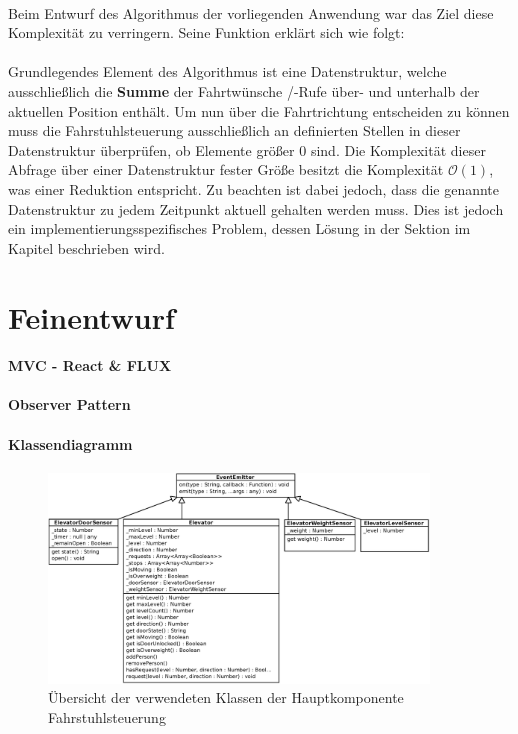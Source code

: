\paragraph{}Beim Entwurf des Algorithmus der vorliegenden Anwendung war das Ziel diese Komplexität zu verringern. Seine Funktion erklärt sich wie folgt:\\ \\ Grundlegendes Element des Algorithmus ist eine Datenstruktur, welche ausschließlich die \textbf{Summe} der Fahrtwünsche /-Rufe über- und unterhalb der aktuellen Position enthält. Um nun über die Fahrtrichtung entscheiden zu können muss die Fahrstuhlsteuerung ausschließlich an definierten Stellen in dieser Datenstruktur überprüfen, ob Elemente größer 0 sind. Die Komplexität dieser Abfrage über einer Datenstruktur fester Größe besitzt die Komplexität $\mathcal{O}(1)$, was einer Reduktion entspricht. Zu beachten ist dabei jedoch, dass die genannte Datenstruktur zu jedem Zeitpunkt aktuell gehalten werden muss. Dies ist jedoch ein implementierungsspezifisches Problem, dessen Lösung in der Sektion \textit{} im Kapitel \textbf{} beschrieben wird.

\section{Feinentwurf}

\paragraph{MVC - React \& FLUX}
\paragraph{Observer Pattern}
\paragraph{Klassendiagramm}
\begin{figure}[h!]
	\centering
	\includegraphics[width=0.9\textwidth]{images/klassendiagramm.eps}
	\caption{Übersicht der verwendeten Klassen der Hauptkomponente Fahrstuhlsteuerung}
	\label{klassdiagramm}
\end{figure}

